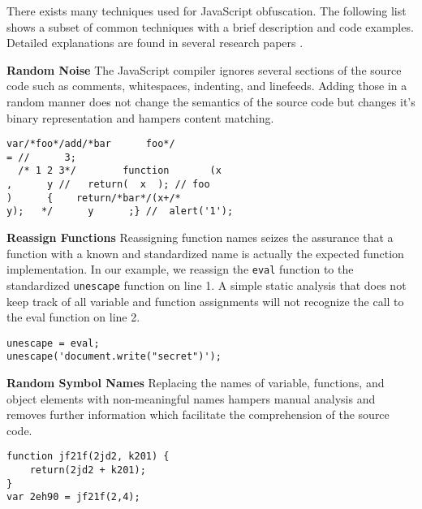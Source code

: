 			There exists many techniques used for JavaScript obfuscation. The following list shows a subset of common techniques with a brief description and code examples. Detailed explanations are found in several research papers \cite{caffinemonkey, Xu:2013:JMS:2435349.2435364, kim2011suspicious}.
			
			\def\leftside{0.475\textwidth}
			\def\rightside{0.475\textwidth}
			\begin{itemize}
					\begin{minipage}{\leftside}
						\item \textbf{Random Noise} The JavaScript compiler ignores several sections of the source code such as comments, whitespaces, indenting, and linefeeds. Adding those in a random manner does not change the semantics of the source code but changes it's binary representation and hampers content matching.
					\end{minipage} \hspace{1em}
					\begin{minipage}{\rightside}	
							\begin{lstlisting}
var/*foo*/add/*bar      foo*/
= //      3;
  /* 1 2 3*/        function       (x
,      y //   return(  x  ); // foo
)      {    return/*bar*/(x+/*
y);   */      y      ;} //  alert('1');
\end{lstlisting}
					\end{minipage} 
			
					\begin{minipage}{\leftside}
						\item \textbf{Reassign Functions} Reassigning function names seizes the assurance that a function with a known and standardized name is actually the expected function implementation. In our example, we reassign the \texttt{eval} function to the standardized \texttt{unescape} function on line 1. A simple static analysis that does not keep track of all variable and function assignments will not recognize the call to the eval function on line 2.
					\end{minipage} \hspace{1em}
					\begin{minipage}{\rightside}	
						\begin{lstlisting}
unescape = eval;
unescape('document.write("secret")');
\end{lstlisting}
					\end{minipage} 
					
					\begin{minipage}{\leftside}
						\item \textbf{Random Symbol Names} Replacing the names of variable, functions, and object elements with non-meaningful names hampers manual analysis and removes further information which facilitate the comprehension of the source code.
					\end{minipage} \hspace{1em}
					\begin{minipage}{\rightside}	
						\begin{lstlisting}
function jf21f(2jd2, k201) {
	return(2jd2 + k201);
}
var 2eh90 = jf21f(2,4);
\end{lstlisting}
					\end{minipage} 	
					

\end{itemize}
